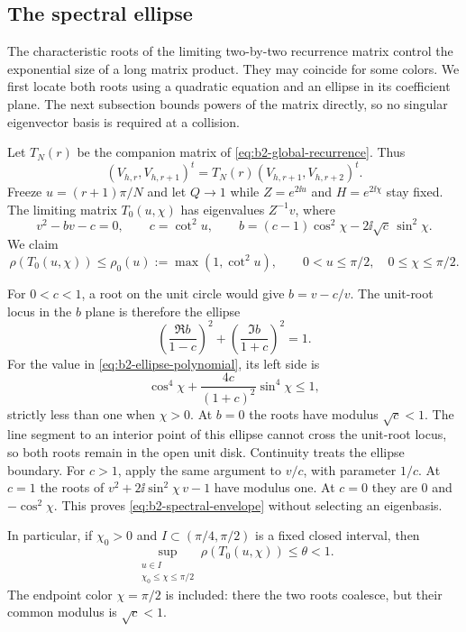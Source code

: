 \subsection{The spectral ellipse}

The characteristic roots of the limiting two-by-two recurrence matrix control the exponential size of a long matrix product. They may coincide for some colors. We first locate both roots using a quadratic equation and an ellipse in its coefficient plane. The next subsection bounds powers of the matrix directly, so no singular eigenvector basis is required at a collision.

Let $T_N(r)$ be the companion matrix of
\eqref{eq:b2-global-recurrence}. Thus
\[
 (V_{h,r},V_{h,r+1})^t=T_N(r)(V_{h,r+1},V_{h,r+2})^t.
\]
Freeze $u=(r+1)\pi/N$ and let $Q\to1$ while
$Z=e^{2\ii u}$ and $H=e^{2\ii\chi}$ stay fixed. The limiting
matrix $T_0(u,\chi)$ has eigenvalues $Z^{-1}v$, where
\begin{equation}\label{eq:b2-ellipse-polynomial}
 v^2-bv-c=0,\qquad
 c=\cot^2u,\qquad
 b=(c-1)\cos^2\chi-2\ii\sqrt c\,\sin^2\chi.
\end{equation}
We claim
\begin{equation}\label{eq:b2-spectral-envelope}
 \rho(T_0(u,\chi))\le \rho_0(u):=\max(1,\cot^2u),
 \qquad 0<u\le\pi/2,\quad0\le\chi\le\pi/2.
\end{equation}

For $0<c<1$, a root on the unit circle would give $b=v-c/v$.
The unit-root locus in the $b$ plane is therefore the ellipse
\[
 \left(\frac{\Re b}{1-c}\right)^2+
 \left(\frac{\Im b}{1+c}\right)^2=1.
\]
For the value in \eqref{eq:b2-ellipse-polynomial}, its left side is
\[
 \cos^4\chi+\frac{4c}{(1+c)^2}\sin^4\chi\le1,
\]
strictly less than one when $\chi>0$. At $b=0$ the roots have
modulus $\sqrt c<1$. The line segment to an interior point of this
ellipse cannot cross the unit-root locus, so both roots remain in
the open unit disk. Continuity treats the ellipse boundary.
For $c>1$, apply the same argument to $v/c$, with parameter $1/c$.
At $c=1$ the roots of
$v^2+2\ii\sin^2\chi\,v-1$ have modulus one. At $c=0$ they are
$0$ and $-\cos^2\chi$. This proves
\eqref{eq:b2-spectral-envelope} without selecting an eigenbasis.

In particular, if $\chi_0>0$ and
$I\subset(\pi/4,\pi/2)$ is a fixed closed interval, then
\begin{equation}\label{eq:b2-strict-spectral}
 \sup_{\substack{u\in I\\\chi_0\le\chi\le\pi/2}}
 \rho(T_0(u,\chi))\le\theta<1.
\end{equation}
The endpoint color $\chi=\pi/2$ is included: there the two roots
coalesce, but their common modulus is $\sqrt c<1$.

